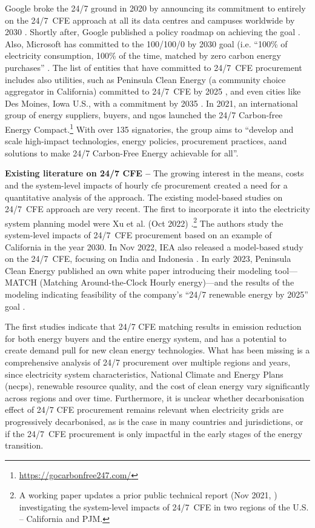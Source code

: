 Google broke the 24/7 ground in 2020 by announcing its commitment to entirely on the 24/7~CFE approach at all its data centres and campuses worldwide by 2030 \cite{google-247by2030}.
Shortly after, Google published a policy roadmap on achieving the goal \cite{google-PolicyRoadmap}.
Also, Microsoft has committed to the 100/100/0 by 2030 goal (i.e. \enquote{100\% of electricity consumption, 100\% of the time, matched by zero carbon energy purchases} \cite{Microsoft-vision}. 
The list of entities that have committed to 24/7~CFE procurement includes also utilities, such as Peninsula Clean Energy (a community choice aggregator in California) committed to 24/7~CFE by 2025 \cite{peninsula-OurPathto247}, and even cities like Des Moines, Iowa U.S., with a commitment by 2035 \cite{iowaenvcouncil-247}. In 2021, an international group of energy suppliers, buyers, and \gls{ngo}s launched the 24/7 Carbon-free Energy Compact.\footnote{\url{https://gocarbonfree247.com/}}
With over 135 signatories, the group aims to \enquote{develop and scale high-impact technologies, energy policies, procurement practices, aand solutions to make 24/7 Carbon-Free Energy achievable for all}.


\textbf{Existing literature on 24/7 CFE --} The growing interest in the means, costs and the system-level impacts of hourly \gls{cfe} procurement created a need for a quantitative analysis of the approach.
The existing model-based studies on 24/7~CFE approach are very recent.
The first to incorporate it into the electricity system planning model were Xu et al. (Oct 2022) \cite{xu-247CFE-SSRN}.\footnote{A working paper updates a prior public technical report (Nov 2021, \cite{xu-247CFE-report}) investigating the system-level impacts of 24/7~CFE in two regions of the U.S. -- California and PJM.} 
The authors study the system-level impacts of 24/7~CFE procurement based on an example of California in the year 2030.
In Nov 2022, IEA also released a model-based study on the 24/7~CFE, focusing on India and Indonesia \cite{ieaAdvancingDecarbonisationClean2022}.
In early 2023, Peninsula Clean Energy published an own white paper introducing their modeling tool---MATCH (Matching Around-the-Clock Hourly energy)---and the results of the modeling indicating feasibility of the company's \enquote{24/7 renewable energy by 2025} goal \cite{peninsula-report247}.

The first studies indicate that 24/7 CFE matching results in emission reduction for both energy buyers and the entire energy system, and has a potential to create demand pull for new clean energy technologies.
What has been missing is a comprehensive analysis of 24/7 procurement over multiple regions and years, since electricity system characteristics, National Climate and Energy Plans (\gls{necp}s), renewable resource quality, and the cost of clean energy vary significantly across regions and over time.
Furthermore, it is unclear whether decarbonisation effect of 24/7 CFE procurement remains relevant when electricity grids are progressively decarbonised, as is the case in many countries and jurisdictions, or if the 24/7~CFE procurement is only impactful in the early stages of the energy transition.


